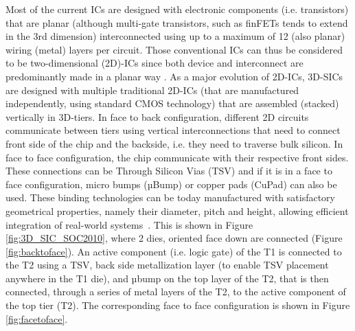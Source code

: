 Most of the current ICs are designed with electronic components (i.e. transistors) that are planar (although multi-gate transistors, such as finFETs tends to extend in the 3rd dimension) interconnected using up to a maximum of 12 (also planar) wiring (metal) layers per circuit. Those conventional ICs can thus be considered to be two-dimensional (2D)-ICs since both device and interconnect are predominantly made in a planar way \cite{1393404,fujitsu08}. As a major evolution of 2D-ICs, 3D-SICs are designed with multiple traditional 2D-ICs (that are manufactured independently, using standard CMOS technology) that are assembled (stacked) vertically in 3D-tiers. In face to back configuration, different 2D circuits communicate between tiers using vertical interconnections that need to connect front side of the chip and the backside, i.e. they need to traverse bulk silicon. In face to face configuration, the chip communicate with their respective front sides. These connections can be Through Silicon Vias (TSV) and if it is in a face to face configuration, micro bumps (µBump) or copper pads (CuPad) can also be used. These binding technologies can be today manufactured with satisfactory geometrical properties, namely their diameter, pitch and height, allowing efficient integration of real-world systems~\cite{1705326,5746413}. This is shown in Figure \ref{fig:3D_SIC_SOC2010}, where 2 dies, oriented face down are connected (Figure \ref{fig:backtoface}). An active component (i.e. logic gate) of the T1 is connected to the T2 using a TSV, back side metallization layer (to enable TSV placement anywhere in the T1 die), and µbump on the top layer of the T2, that is then connected, through a series of metal layers of the T2, to the active component of the top tier (T2). The corresponding face to face configuration is shown in Figure \ref{fig:facetoface}.

